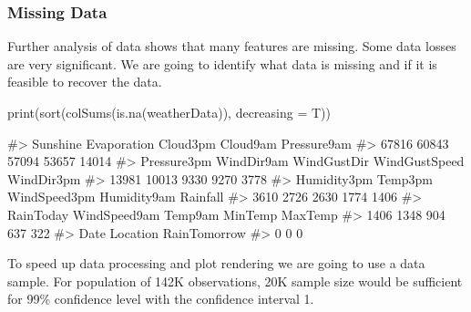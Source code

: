 \hypertarget{missing-data}{%
\subsubsection{Missing Data}\label{missing-data}}

Further analysis of data shows that many features are missing. Some data
losses are very significant. We are going to identify what data is
missing and if it is feasible to recover the data.

\begin{Schunk}
\begin{Sinput}
print(sort(colSums(is.na(weatherData)), decreasing = T))
\end{Sinput}
\begin{Soutput}
#>      Sunshine   Evaporation      Cloud3pm      Cloud9am   Pressure9am 
#>         67816         60843         57094         53657         14014 
#>   Pressure3pm    WindDir9am   WindGustDir WindGustSpeed    WindDir3pm 
#>         13981         10013          9330          9270          3778 
#>   Humidity3pm       Temp3pm  WindSpeed3pm   Humidity9am      Rainfall 
#>          3610          2726          2630          1774          1406 
#>     RainToday  WindSpeed9am       Temp9am       MinTemp       MaxTemp 
#>          1406          1348           904           637           322 
#>          Date      Location  RainTomorrow 
#>             0             0             0
\end{Soutput}
\end{Schunk}

To speed up data processing and plot rendering we are going to use a
data sample. For population of 142K observations, 20K sample size would
be sufficient for 99\% confidence level with the confidence interval 1.

